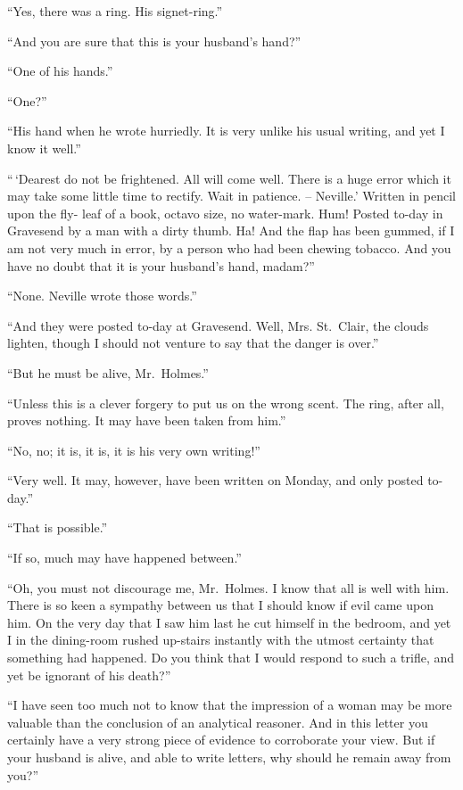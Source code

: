 “Yes, there was a ring. His signet-ring.”

“And you are sure that this is your husband’s hand?”

“One of his hands.”

“One?”

“His hand when he wrote hurriedly. It is very unlike his
usual writing, and yet I know it well.”

“\,‘Dearest do not be frightened. All will come well. There
is a huge error which it may take some little time to rectify.
Wait in patience. -- Neville.’ Written in pencil upon the fly-%
leaf of a book, octavo size, no water-mark. Hum! Posted
to-day in Gravesend by a man with a dirty thumb. Ha!
And the flap has been gummed, if I am not very much
in error, by a person who had been chewing tobacco.
And you have no doubt that it is your husband’s hand,
madam?”

“None. Neville wrote those words.”

“And they were posted to-day at Gravesend. Well, Mrs.
St.~Clair, the clouds lighten, though I should not venture to
say that the danger is over.”

“But he must be alive, Mr.~Holmes.”

“Unless this is a clever forgery to put us on the wrong
scent. The ring, after all, proves nothing. It may have been
taken from him.”

“No, no; it is, it is, it is his very own writing!”

“Very well. It may, however, have been written on Monday,
and only posted to-day.”

“That is possible.”

“If so, much may have happened between.”

“Oh, you must not discourage me, Mr.~Holmes. I know
that all is well with him. There is so keen a sympathy between
us that I should know if evil came upon him. On the
very day that I saw him last he cut himself in the bedroom,
and yet I in the dining-room rushed up-stairs instantly with
the utmost certainty that something had happened. Do you
think that I would respond to such a trifle, and yet be ignorant
of his death?”

“I have seen too much not to know that the impression of
a woman may be more valuable than the conclusion of an analytical
reasoner. And in this letter you certainly have a very
strong piece of evidence to corroborate your view. But if
your husband is alive, and able to write letters, why should he
remain away from you?”

